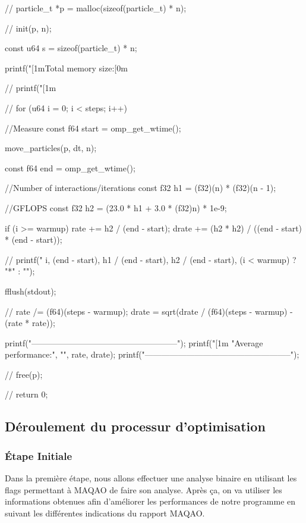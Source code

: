 \documentclass[a4paper, 12pt, twoside]{article}
\begin{document}
\begin{customFrame}
{  //
  particle_t *p = malloc(sizeof(particle_t) * n);

  //
  init(p, n);

  const u64 s = sizeof(particle_t) * n;
  
  printf("\n{}[1mTotal memory size:[0m %
  
  //
  printf("[1m%
  
  //
  for (u64 i = 0; i < steps; i++)
    {
      //Measure
      const f64 start = omp_get_wtime();

      move_particles(p, dt, n);

      const f64 end = omp_get_wtime();

      //Number of interactions/iterations
      const f32 h1 = (f32)(n) * (f32)(n - 1);

      //GFLOPS
      const f32 h2 = (23.0 * h1 + 3.0 * (f32)n) * 1e-9;
      
      if (i >= warmup)
	{
	  rate += h2 / (end - start);
	  drate += (h2 * h2) / ((end - start) * (end - start));
	}

      //
      printf("%
	     i,
	     (end - start),
	     h1 / (end - start),
	     h2 / (end - start),
	     (i < warmup) ? "*" : "");
      
      fflush(stdout);
    }

  //
  rate /= (f64)(steps - warmup);
  drate = sqrt(drate / (f64)(steps - warmup) - (rate * rate));

  printf("-----------------------------------------------------\n");
  printf("[1m%
	 "Average performance:", "", rate, drate);
  printf("-----------------------------------------------------\n");
  
  //
  free(p);

  //
  return 0;
}
\end{customFrame}




\newpage
\subsection{Déroulement du processur d'optimisation}
\subsubsection{Étape Initiale}
Dans la première étape, nous allons effectuer une analyse binaire en utilisant les flags permettant à MAQAO de faire son analyse. Après ça, on va utiliser les informations obtenues afin d'améliorer les performances de notre programme en suivant les différentes indications du rapport MAQAO.
\end{document}
